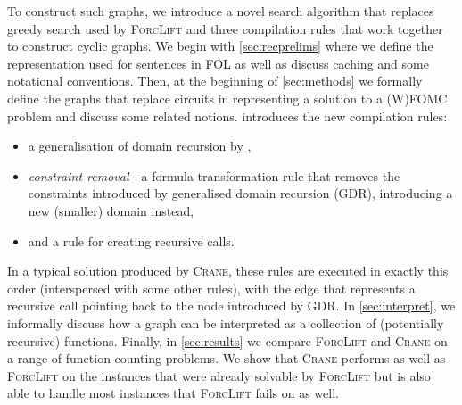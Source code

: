 \documentclass[letterpaper]{article} %
\theoremstyle{definition}
\theoremstyle{remark}
\begin{document}

To construct such graphs, we introduce a novel search algorithm that replaces
greedy search used by \textsc{ForcLift} and three compilation rules that work
together to construct cyclic graphs. We begin with \cref{sec:recprelims} where
we define the representation used for sentences in FOL as well as discuss
caching and some notational conventions. Then, at the beginning of
\cref{sec:methods} we formally define the graphs that replace circuits in
representing a solution to a (W)FOMC problem and discuss some related notions.
 introduces the new compilation rules:
\begin{itemize}
  \item a generalisation of domain recursion by \citet{DBLP:conf/nips/Broeck11},
  \item \emph{constraint removal}---a formula transformation rule that removes
        the constraints introduced by generalised domain recursion (GDR),
        introducing a new (smaller) domain instead,
  \item and a rule for creating recursive calls.
\end{itemize}
In a typical solution produced by \textsc{Crane}, these rules are executed in
exactly this order (interspersed with some other rules), with the edge that
represents a recursive call pointing back to the node introduced by GDR\@. In
\cref{sec:interpret}, we informally discuss how a graph can be interpreted as a
collection of (potentially recursive) functions. Finally, in \cref{sec:results}
we compare \textsc{ForcLift} and \textsc{Crane} on a range of function-counting
problems. We show that \textsc{Crane} performs as well as \textsc{ForcLift} on
the instances that were already solvable by \textsc{ForcLift} but is also able
to handle most instances that \textsc{ForcLift} fails on as well.


\end{document}
